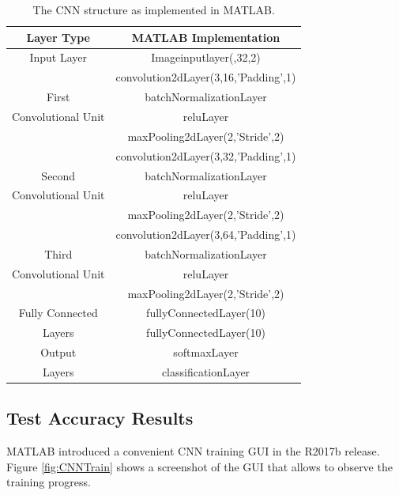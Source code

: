 \begin{table}[h]
	\begin{center}
		\begin{tabular}{||c | c||}
			\hline
			\textbf{Layer Type}& \textbf{MATLAB Implementation} \\ [0.5ex]
			\hline
			Input Layer& Imageinputlayer(\lbrack32,32,2\rbrack)\\
			\hline
			 & convolution2dLayer(3,16,'Padding',1) \\
			First& batchNormalizationLayer\\
			Convolutional Unit& reluLayer\\
			 & maxPooling2dLayer(2,'Stride',2)\\
			\hline
			 & convolution2dLayer(3,32,'Padding',1)\\
			Second& batchNormalizationLayer\\
			Convolutional Unit& reluLayer\\
			 & maxPooling2dLayer(2,'Stride',2)\\
			\hline
			 & convolution2dLayer(3,64,'Padding',1)\\
			Third& batchNormalizationLayer\\
			Convolutional Unit& reluLayer\\
			& maxPooling2dLayer(2,'Stride',2)\\
			\hline
			Fully Connected& fullyConnectedLayer(10)\\
			Layers& fullyConnectedLayer(10)\\
			\hline
			Output& softmaxLayer\\
			Layers& classificationLayer\\
			\hline
			
		\end{tabular}
		\caption{The CNN structure as implemented in MATLAB.}
		\label{Tab:CNNStructure}
	\end{center}
\end{table}


\subsection{Test Accuracy Results}

MATLAB introduced a convenient CNN training GUI in the R2017b release. Figure \ref{fig:CNNTrain} shows a screenshot of the GUI that allows to observe the training progress.

